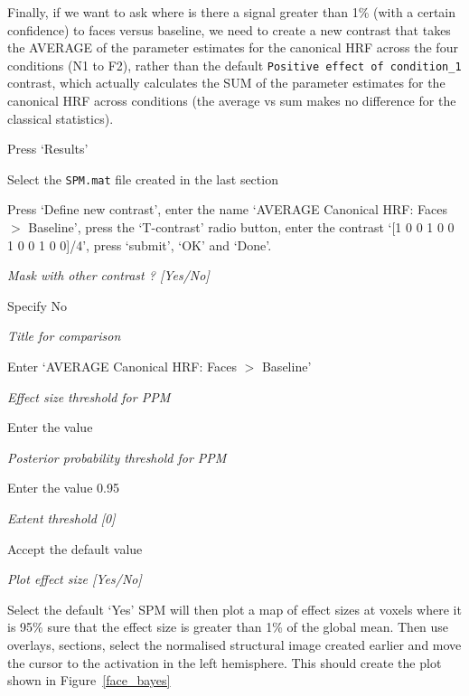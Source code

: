 Finally, if we want to ask where is there a signal greater than 1\% (with a certain confidence) to faces versus baseline, we need to create a new contrast that takes the AVERAGE of the parameter estimates for the canonical HRF across the four conditions (N1 to F2), rather than the default \verb!Positive effect of condition_1! contrast, which actually calculates the SUM of the parameter estimates for the canonical HRF across conditions (the average vs sum makes no difference for the classical statistics).

\bi
\item{Press `Results'}
\item{Select the \verb!SPM.mat! file created in the last section}
\item{Press `Define new contrast', enter the name `AVERAGE Canonical HRF: Faces $>$ Baseline', press the `T-contrast' radio button, enter the contrast `[1 0 0 1 0 0 1 0 0 1 0 0]/4', press `submit', `OK' and `Done'.}
\item{\em Mask with other contrast ? [Yes/No]}
\item{Specify No}
\item{\em Title for comparison}
\item{Enter `AVERAGE Canonical HRF: Faces $>$ Baseline'}
\item{\em Effect size threshold for PPM}
\item{Enter the value }
\item{\em Posterior probability threshold for PPM}
\item{Enter the value 0.95}
\item{\em Extent threshold [0]}
\item{Accept the default value}
\item{\em Plot effect size [Yes/No]}
\item{Select the default `Yes'}
\ei
SPM will then plot a map of effect sizes at voxels 
where it is 95\% sure that the effect size is greater 
than 1\% of the global mean.
Then use overlays, sections, select the 
normalised structural image created earlier and move the cursor to the activation in the left hemisphere. This should create the plot shown in Figure~\ref{face_bayes}


